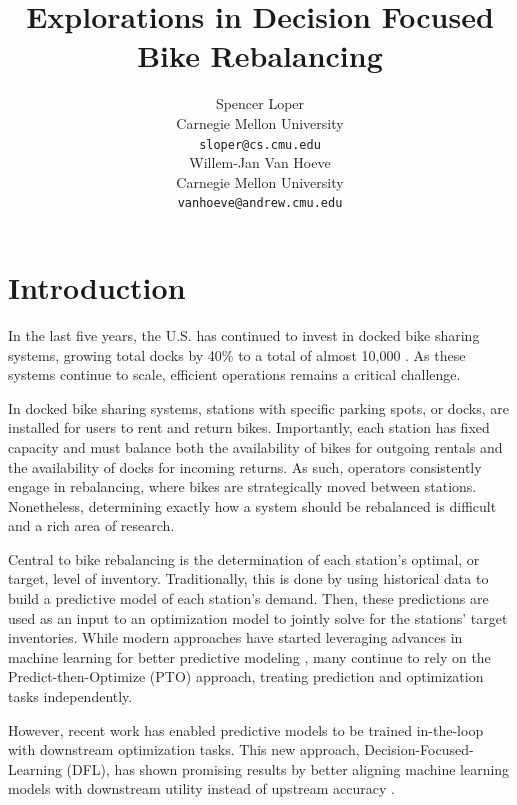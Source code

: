\documentclass{article}
\title{Explorations in Decision Focused Bike Rebalancing}
\author{
    Spencer Loper \\
    Carnegie Mellon University \\
    \texttt{sloper@cs.cmu.edu} \\
    \And
    Willem-Jan Van Hoeve \\
    Carnegie Mellon University \\
    \texttt{vanhoeve@andrew.cmu.edu} \\
}
\begin{document}
\maketitle





\section{Introduction}

In the last five years, the U.S. has continued to invest in docked bike sharing systems, growing total docks by 40\% to a total of almost 10,000 \cite{bts2026bikeshare}. As these systems continue to scale, efficient
operations remains a critical challenge.

In docked bike sharing systems, stations with specific parking spots, or docks, are installed for users to rent and return bikes. Importantly, each station has fixed capacity and must balance both the availability of bikes 
for outgoing rentals and the availability of docks for incoming returns. As such, operators consistently engage in rebalancing, where bikes are strategically moved between stations. Nonetheless, determining exactly how a system should be rebalanced
is difficult and a rich area of research.

Central to bike rebalancing is the determination of each station's optimal, or target, level of inventory. Traditionally, this is done by using historical data to build a predictive model 
of each station's demand. Then, these predictions are used as an input to an optimization model to jointly solve for the stations' target inventories. While modern approaches 
have started leveraging advances in machine learning for better predictive modeling \cite{zhou2022pto}, many continue to rely on the Predict-then-Optimize (PTO) approach, treating prediction and optimization tasks independently. 

However, recent work \cite{amos2017optnet, elmachtoub2022spo} has enabled predictive models to be trained in-the-loop with downstream optimization tasks. This new approach, Decision-Focused-Learning (DFL), has shown
promising results by better aligning machine learning models with downstream utility instead of upstream accuracy \cite{donti2017task}. 
\end{document}
